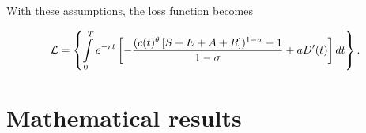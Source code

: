 \documentclass{amsart}
\begin{document}
With these assumptions, the loss function becomes


\begin{align} \label{loss}
\mathcal{L}=\left\{ \intop_0^{T}e^{-rt}\left[
-\frac{(c(t)^{\theta} \left[S+E+A+R\right])^{1-\sigma}-1}{1-\sigma}
+aD'(t)\right]dt\right\}. 
\end{align}

\section{Mathematical results}
\end{document}
